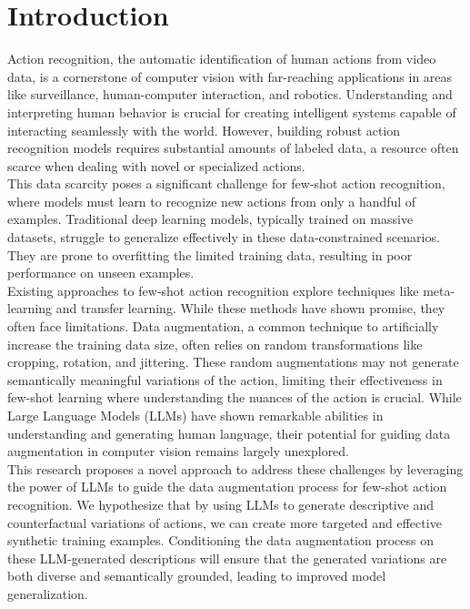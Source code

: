 \section{Introduction}

Action recognition, the automatic identification of human actions from video data, is a cornerstone of computer vision with far-reaching applications in areas like surveillance, human-computer interaction, and robotics. Understanding and interpreting human behavior is crucial for creating intelligent systems capable of interacting seamlessly with the world. However, building robust action recognition models requires substantial amounts of labeled data, a resource often scarce when dealing with novel or specialized actions.\\

This data scarcity poses a significant challenge for few-shot action recognition, where models must learn to recognize new actions from only a handful of examples. Traditional deep learning models, typically trained on massive datasets, struggle to generalize effectively in these data-constrained scenarios. They are prone to overfitting the limited training data, resulting in poor performance on unseen examples.\\

Existing approaches to few-shot action recognition explore techniques like meta-learning and transfer learning. While these methods have shown promise, they often face limitations. Data augmentation, a common technique to artificially increase the training data size, often relies on random transformations like cropping, rotation, and jittering. These random augmentations may not generate semantically meaningful variations of the action, limiting their effectiveness in few-shot learning where understanding the nuances of the action is crucial.  While Large Language Models (LLMs) have shown remarkable abilities in understanding and generating human language, their potential for guiding data augmentation in computer vision remains largely unexplored.\\

This research proposes a novel approach to address these challenges by leveraging the power of LLMs to guide the data augmentation process for few-shot action recognition. We hypothesize that by using LLMs to generate descriptive and counterfactual variations of actions, we can create more targeted and effective synthetic training examples. Conditioning the data augmentation process on these LLM-generated descriptions will ensure that the generated variations are both diverse and semantically grounded, leading to improved model generalization.\\

